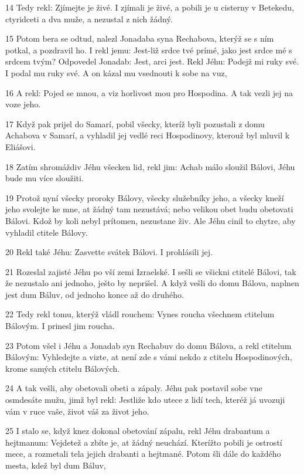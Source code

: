 \par 14 Tedy rekl: Zjímejte je živé. I zjímali je živé, a pobili je u cisterny v Betekedu, ctyridceti a dva muže, a nezustal z nich žádný.
\par 15 Potom bera se odtud, nalezl Jonadaba syna Rechabova, kterýž se s ním potkal, a pozdravil ho. I rekl jemu: Jest-liž srdce tvé prímé, jako jest srdce mé s srdcem tvým? Odpovedel Jonadab: Jest, arci jest. Rekl Jéhu: Podejž mi ruky své. I podal mu ruky své. A on kázal mu vsednouti k sobe na vuz,
\par 16 A rekl: Pojed se mnou, a viz horlivost mou pro Hospodina. A tak vezli jej na voze jeho.
\par 17 Když pak prijel do Samarí, pobil všecky, kteríž byli pozustali z domu Achabova v Samarí, a vyhladil jej vedlé reci Hospodinovy, kterouž byl mluvil k Eliášovi.
\par 18 Zatím shromáždiv Jéhu všecken lid, rekl jim: Achab málo sloužil Bálovi, Jéhu bude mu více sloužiti.
\par 19 Protož nyní všecky proroky Bálovy, všecky služebníky jeho, a všecky kneží jeho svolejte ke mne, at žádný tam nezustává; nebo velikou obet budu obetovati Bálovi. Kdož by koli nebyl prítomen, nezustane živ. Ale Jéhu cinil to chytre, aby vyhladil ctitele Bálovy.
\par 20 Rekl také Jéhu: Zasvette svátek Bálovi. I prohlásili jej.
\par 21 Rozeslal zajisté Jéhu po vší zemi Izraelské. I sešli se všickni ctitelé Bálovi, tak že nezustalo ani jednoho, ješto by neprišel. A když vešli do domu Bálova, naplnen jest dum Báluv, od jednoho konce až do druhého.
\par 22 Tedy rekl tomu, kterýž vládl rouchem: Vynes roucha všechnem ctitelum Bálovým. I prinesl jim roucha.
\par 23 Potom všel i Jéhu a Jonadab syn Rechabuv do domu Bálova, a rekl ctitelum Bálovým: Vyhledejte a vizte, at není zde s vámi nekdo z ctitelu Hospodinových, krome samých ctitelu Bálových.
\par 24 A tak vešli, aby obetovali obeti a zápaly. Jéhu pak postavil sobe vne osmdesáte mužu, jimž byl rekl: Jestliže kdo utece z lidí tech, kteréž já uvozuji vám v ruce vaše, život váš za život jeho.
\par 25 I stalo se, když knez dokonal obetování zápalu, rekl Jéhu drabantum a hejtmanum: Vejdetež a zbíte je, at žádný neuchází. Kterížto pobili je ostrostí mece, a rozmetali tela jejich drabanti a hejtmané. Potom šli dále do každého mesta, kdež byl dum Báluv,
